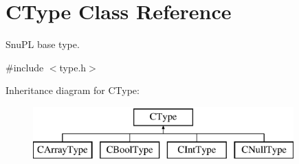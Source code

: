 \hypertarget{classCType}{\section{C\-Type Class Reference}
\label{classCType}
}


Snu\-P\-L base type.  




{\ttfamily \#include $<$type.\-h$>$}

Inheritance diagram for C\-Type\-:\begin{figure}[H]
\begin{center}
\leavevmode
\includegraphics[height=2.000000cm]{classCType}
\end{center}
\end{figure}
